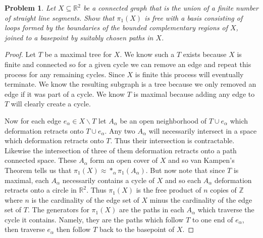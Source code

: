 \documentclass{article}
\newtheorem{problem}{Problem}
\begin{document}
\begin{problem}
Let $X \subseteq \mathbb{R}^2$ be a connected graph that is the union of a finite number of straight line segments. Show that $\pi_1(X)$ is free with a basis consisting of loops formed by the boundaries of the bounded complementary regions of $X$, joined to a basepoint by suitably chosen paths in $X$.
\end{problem}
\begin{proof}
Let $T$ be a maximal tree for $X$. We know such a $T$ exists because $X$ is finite and connected so for a given cycle we can remove an edge and repeat this process for any remaining cycles. Since $X$ is finite this process will eventually terminate. We know the resulting subgraph is a tree because we only removed an edge if it was part of a cycle. We know $T$ is maximal because adding any edge to $T$ will clearly create a cycle.

Now for each edge $e_{\alpha} \in X \backslash T$ let $A_{\alpha}$ be an open neighborhood of $T \cup e_{\alpha}$ which deformation retracts onto $T \cup e_{\alpha}$. Any two $A_{\alpha}$ will necessarily intersect in a space which deformation retracts onto $T$. Thus their intersection is contractable. Likewise the intersection of three of them deformation retracts onto a path connected space. These $A_{\alpha}$ form an open cover of $X$ and so van Kampen's Theorem tells us that $\pi_1(X) \approx *_{\alpha} \pi_1(A_{\alpha})$. But now note that since $T$ is maximal, each $A_{\alpha}$ necessarily contains a cycle of $X$ and so each $A_{\alpha}$ deformation retracts onto a circle in $\mathbb{R}^2$. Thus $\pi_1(X)$ is the free product of $n$ copies of $\mathbb{Z}$ where $n$ is the cardinality of the edge set of $X$ minus the cardinality of the edge set of $T$. The generators for $\pi_1(X)$ are the paths in each $A_{\alpha}$ which traverse the cycle it contains. Namely, they are the paths which follow $T$ to one end of $e_{\alpha}$, then traverse $e_{\alpha}$ then follow $T$ back to the basepoint of $X$.
\end{proof}
\end{document}
